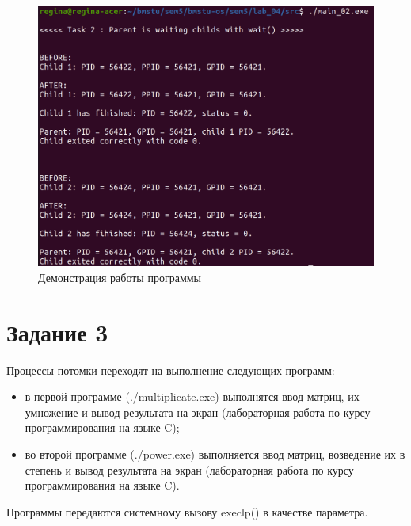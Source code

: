 \begin{figure}[H]
	\begin{center}
		\includegraphics[scale=0.3]{inc/wait.png}
	\end{center}
	\captionsetup{justification=centering}
	\caption{Демонстрация работы программы}
	\label{img:wait}
\end{figure}

\section*{Задание 3}

Процессы-потомки переходят на выполнение следующих программ:

\begin{itemize}
	\item в первой программе (./multiplicate.exe) выполнятся ввод матриц, их умножение и вывод результата на экран (лабораторная работа по курсу программирования на языке C);
	\item во второй программе (./power.exe) выполняется ввод матриц, возведение их в степень и вывод результата на экран (лабораторная работа по курсу программирования на языке C).
\end{itemize}

Программы передаются системному вызову execlp() в качестве параметра.

